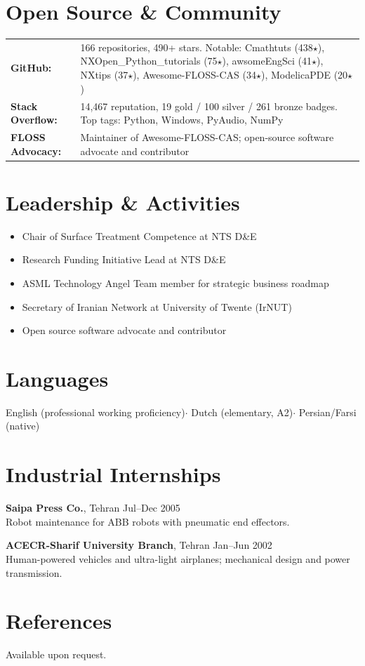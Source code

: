 \documentclass[11pt,a4paper]{article}
\begin{document}
\section{Open Source \& Community}

\begin{tabularx}{\textwidth}{@{}lX@{}}
 \textbf{GitHub:}     & 166 repositories, 490+ stars. Notable: Cmathtuts (438$\star$), NXOpen\_Python\_tutorials (75$\star$), awsomeEngSci (41$\star$), NXtips (37$\star$), Awesome-FLOSS-CAS (34$\star$), ModelicaPDE (20$\star$) \\
 \textbf{Stack Overflow:} & 14,467 reputation, 19 gold / 100 silver / 261 bronze badges. Top tags: Python, Windows, PyAudio, NumPy \\
 \textbf{FLOSS Advocacy:} & Maintainer of Awesome-FLOSS-CAS; open-source software advocate and contributor \\
\end{tabularx}

\section{Leadership \& Activities}

\begin{itemize}
 \item Chair of Surface Treatment Competence at NTS D\&E
 \item Research Funding Initiative Lead at NTS D\&E
 \item ASML Technology Angel Team member for strategic business roadmap
 \item Secretary of Iranian Network at University of Twente (IrNUT)
 \item Open source software advocate and contributor
\end{itemize}

\section{Languages}

English (professional working proficiency)\enspace$\cdot$\enspace
Dutch (elementary, A2)\enspace$\cdot$\enspace
Persian/Farsi (native)

\section{Industrial Internships}

\textbf{Saipa Press Co.}, Tehran \hfill Jul--Dec 2005 \\
{\small Robot maintenance for ABB robots with pneumatic end effectors.}

\vspace{4pt}
\textbf{ACECR-Sharif University Branch}, Tehran \hfill Jan--Jun 2002 \\
{\small Human-powered vehicles and ultra-light airplanes; mechanical design and power transmission.}

\section{References}

Available upon request.
\end{document}
